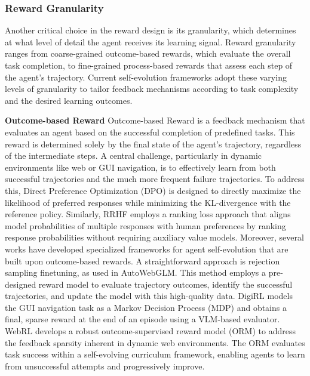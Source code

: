 \documentclass[10pt]{article} %
\begin{document}
\subsubsection{Reward Granularity}

Another critical choice in the reward design is its granularity, which determines at what level of detail the agent receives its learning signal.
Reward granularity ranges from coarse-grained outcome-based rewards, which evaluate the overall task completion, to fine-grained process-based rewards that assess each step of the agent’s trajectory. Current self-evolution frameworks adopt these varying levels of granularity to tailor feedback mechanisms according to task complexity and the desired learning outcomes.

\textbf{Outcome-based Reward}
Outcome-based Reward is a feedback mechanism that evaluates an agent based on the successful completion of predefined tasks. This reward is determined solely by the final state of the agent’s trajectory, regardless of the intermediate steps. 
A central challenge, particularly in dynamic environments like web or GUI navigation, is to effectively learn from both successful trajectories and the much more frequent failure trajectories.
To address this, Direct Preference Optimization (DPO)\citep{rafailov2023direct} is designed to directly maximize the likelihood of preferred responses while minimizing the KL-divergence with the reference policy.
Similarly, RRHF\citep{yuan2023rrhf} employs a ranking loss approach that aligns model probabilities of multiple responses with human preferences by ranking response probabilities without requiring auxiliary value models.
Moreover, several works have developed specialized frameworks for agent self-evolution that are built upon outcome-based rewards.
A straightforward approach is rejection sampling finetuning, as used in AutoWebGLM\citep{lai2024autowebglm}. This method employs a pre-designed reward model to evaluate trajectory outcomes, identify the successful trajectories, and update the model with this high-quality data.
DigiRL\citep{bai2024digirl} models the GUI navigation task as a Markov Decision Process (MDP) and obtains a final, sparse reward at the end of an episode using a VLM-based evaluator.
WebRL\citep{qi2024webrl} develops a robust outcome-supervised reward model (ORM) to address the feedback sparsity inherent in dynamic web environments. The ORM evaluates task success within a self-evolving curriculum framework, enabling agents to learn from unsuccessful attempts and progressively improve.
\end{document}
